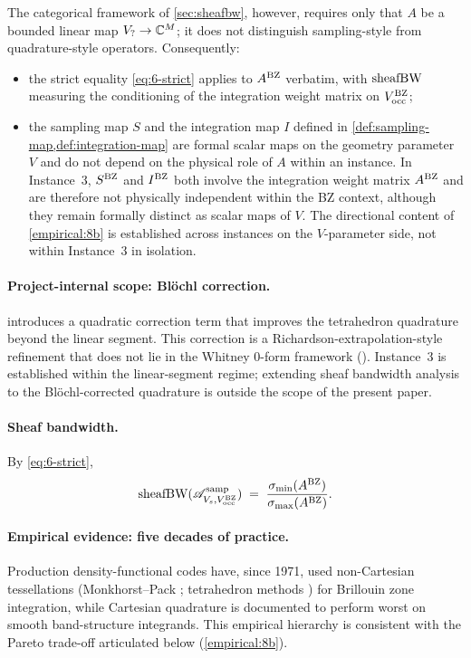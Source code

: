 The categorical framework of \cref{sec:sheafbw}, however, requires
only that $A$ be a bounded linear map $V_? \to \mathbb{C}^M$; it does not
distinguish sampling-style from quadrature-style operators.
Consequently:
\begin{itemize}[leftmargin=*]
\item the strict equality \cref{eq:6-strict} applies to $A^{\mathrm{BZ}}$
  verbatim, with $\operatorname{sheafBW}$ measuring the conditioning of the
  integration weight matrix on $V_{\mathrm{occ}}^{\mathrm{BZ}}$;
\item the sampling map $S$ and the integration map $I$
  defined in \cref{def:sampling-map,def:integration-map}
  are formal scalar maps on the geometry parameter $V$ and do not
  depend on the physical role of $A$ within an instance. In
  Instance~3, $S^{\mathrm{BZ}}$ and $I^{\mathrm{BZ}}$ both involve the integration
  weight matrix $A^{\mathrm{BZ}}$ and are therefore not physically
  independent within the BZ context, although they remain formally
  distinct as scalar maps of $V$. The directional content of
  \cref{empirical:8b} is established across instances on the
  $V$-parameter side, not within Instance~3 in isolation.
\end{itemize}

\paragraph{Project-internal scope: Bl\"ochl correction.}
\cite{Blochl1994} introduces a quadratic correction term that improves
the tetrahedron quadrature beyond the linear segment. This correction
is a Richardson-extrapolation-style refinement that does not lie in
the Whitney $0$-form framework (\cite[\S II.C]{Blochl1994}).
Instance~3 is established within the linear-segment regime; extending
sheaf bandwidth analysis to the Bl\"ochl-corrected quadrature is
outside the scope of the present paper.

\paragraph{Sheaf bandwidth.}
By \cref{eq:6-strict},
\[
  \operatorname{sheafBW}(\mathscr{A}^{\mathrm{samp}}_{V_s, V_{\mathrm{occ}}^{\mathrm{BZ}}})
  \;=\;
  \frac{\sigma_{\min}(A^{\mathrm{BZ}})}{\sigma_{\max}(A^{\mathrm{BZ}})}.
\]

\paragraph{Empirical evidence: five decades of practice.}
Production density-functional codes have, since 1971, used
non-Cartesian tessellations
(Monkhorst--Pack \cite{MonkhorstPack1976}; tetrahedron methods
\cite{LehmannTaut1972,JepsenAndersen1971,Blochl1994}) for Brillouin
zone integration, while Cartesian quadrature is documented to perform
worst on smooth band-structure integrands. This empirical hierarchy
is consistent with the Pareto trade-off articulated below
(\cref{empirical:8b}).

